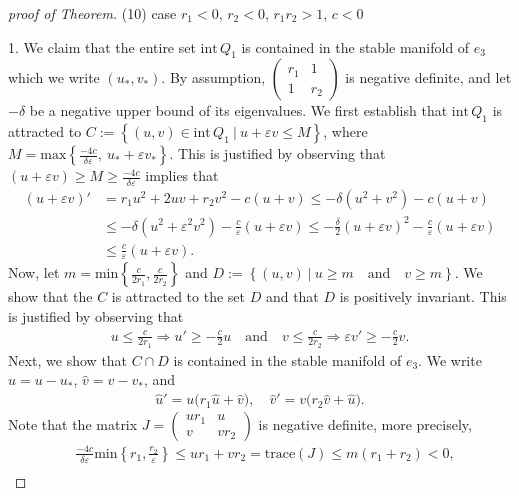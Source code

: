 \documentclass{amsart}
\theoremstyle{definition}
\numberwithin{equation}{section}
\def\ii{{\textrm{int}}\,}
\begin{document}
\begin{proof}[proof of Theorem]
(10) case $r_1<0$, $r_2<0$, $r_1r_2>1$, $c<0$


1. We claim that the entire set $\ii Q_1$ is contained in the stable manifold of $e_3$ which we write $(u_*,v_*)$. By assumption, $\begin{pmatrix} r_1 & 1 \\ 1 & r_2 \end{pmatrix}$ is negative definite, and let $-\delta$ be a negative upper bound of its eigenvalues. We first establish that $\ii Q_1$ is attracted to $C:=\left\{(u,v)\in \ii Q_1 ~|~ u+\varepsilon v \le M\right\}$, where $M=\textrm{max}\left\{\frac{-4c}{\delta\varepsilon}, \:u_*+\varepsilon v_*\right\}$. This is justified by observing that
$(u+\varepsilon v) \ge M\ge \frac{-4c}{\delta \varepsilon}$ implies that
\begin{align*}
 (u+\varepsilon v)' &= r_1 u^2 + 2uv + r_2 v^2 - c(u+v) \le -\delta (u^2 + v^2) - c(u+v)\\
 &\le-\delta (u^2 + \varepsilon^2 v^2) -\frac{c}{\varepsilon}(u + \varepsilon v) \le -\frac{\delta}{2} (u+\varepsilon v)^2 - \frac{c}{\varepsilon}(u+ \varepsilon v)\\
 &\le \frac{c}{\varepsilon} (u+\varepsilon v).
\end{align*}
Now, let $m = \textrm{min}\left\{\frac{c}{2r_1},\frac{c}{2r_2}\right\}$ and $D:= \left\{(u,v)~|~  u \ge m \quad \text{and} \quad  v \ge m\right\}.$ We show that the $C$ is attracted to the set $D$ and that $D$ is positively invariant. This is justified by observing that
\begin{align*}
 u \le \frac{c}{2r_1} \Longrightarrow u' \ge -\frac{c}{2} u \quad \text{and} \quad
 v \le \frac{c}{2r_2} \Longrightarrow \varepsilon  v' \ge -\frac{c}{2} v.
 \end{align*}
Next, we show that $C\cap D$ is contained in the stable manifold of $e_3$. We write $\hat u = u -  u_*$, $\hat v =  v -  v_*$, and 
\begin{align*}
 \hat u' =  u \big(r_1 \hat u + \hat v\big), \quad 
 \hat v' =  v \big(r_2 \hat v + \hat u\big).
\end{align*}
Note that the matrix $J=\begin{pmatrix}  ur_1 &  u \\  v &  vr_2 \end{pmatrix}$ is negative definite, more precisely,
\begin{align*}
 & \frac{-4c}{\delta\varepsilon}\textrm{min}\left\{ r_1, \frac{r_2}{\varepsilon}\right\}\le ur_1 + vr_2 = \textrm{trace}(J) \le m(r_1+ r_2) < 0, \\

\end{align*}
\end{proof}
\end{document}
